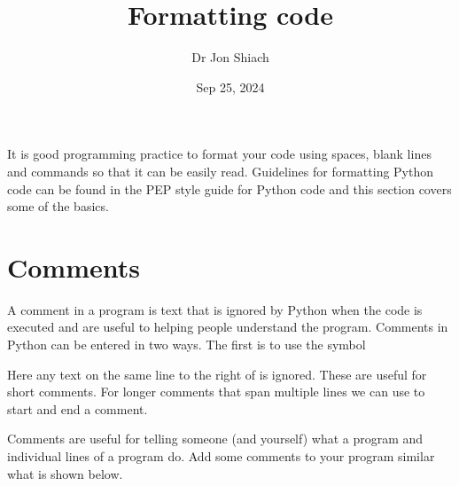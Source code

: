 \documentclass[letterpaper,10pt,english]{jupyterBook}
\title{Formatting code}
\date{Sep 25, 2024}
\author{Dr Jon Shiach}
\begin{document}
\pagestyle{empty}
\sphinxmaketitle
\pagestyle{plain}
\sphinxtableofcontents
\pagestyle{normal}
\label{\detokenize{_pages/1.7_Formatting_code::doc}}


\sphinxAtStartPar
It is good programming practice to format your code using spaces, blank lines and commands so that it can be easily read. Guidelines for formatting Python code can be found in the PEP style guide for Python code and this section covers some of the basics.


\part{Comments}
\label{\detokenize{_pages/1.7_Formatting_code:comments}}
\sphinxAtStartPar
A comment in a program is text that is ignored by Python when the code is executed and are useful to helping people understand the program. Comments in Python can be entered in two ways. The first is to use the \sphinxcode{\sphinxupquote{\#}} symbol

\begin{sphinxVerbatim}[commandchars=\\\{\}]
\end{sphinxVerbatim}

\sphinxAtStartPar
Here any text on the same line to the right of \sphinxcode{\sphinxupquote{\#}} is ignored. These are useful for short comments. For longer comments that span multiple lines we can use  to start and end a comment.

\begin{sphinxVerbatim}[commandchars=\\\{\}]
\end{sphinxVerbatim}

\sphinxAtStartPar
Comments are useful for telling someone (and yourself) what a program and individual lines of a program do. Add some comments to your program similar what is shown below.
\end{document}
